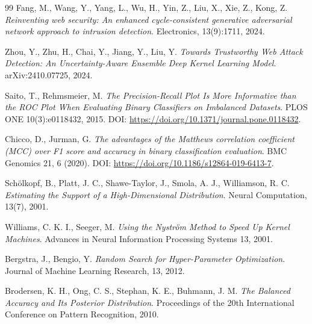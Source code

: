 \documentclass[12pt,oneside]{report}
\begin{document}
\begin{thebibliography}{99}
Fang, M., Wang, Y., Yang, L., Wu, H., Yin, Z., Liu, X., Xie, Z., Kong, Z.
\emph{Reinventing web security: An enhanced cycle-consistent generative adversarial network approach to intrusion detection}.
Electronics, 13(9):1711, 2024.

Zhou, Y., Zhu, H., Chai, Y., Jiang, Y., Liu, Y.
\emph{Towards Trustworthy Web Attack Detection: An Uncertainty-Aware Ensemble Deep Kernel Learning Model}.
arXiv:2410.07725, 2024.

Saito, T., Rehmsmeier, M.
\emph{The Precision-Recall Plot Is More Informative than the ROC Plot When Evaluating Binary Classifiers on Imbalanced Datasets}.
PLOS ONE 10(3):e0118432, 2015. DOI: \url{https://doi.org/10.1371/journal.pone.0118432}.

Chicco, D., Jurman, G.
\emph{The advantages of the Matthews correlation coefficient (MCC) over F1 score and accuracy in binary classification evaluation}.
BMC Genomics 21, 6 (2020). DOI: \url{https://doi.org/10.1186/s12864-019-6413-7}.


Schölkopf, B., Platt, J. C., Shawe-Taylor, J., Smola, A. J., Williamson, R. C.
\emph{Estimating the Support of a High-Dimensional Distribution}.
Neural Computation, 13(7), 2001.

Williams, C. K. I., Seeger, M.
\emph{Using the Nyström Method to Speed Up Kernel Machines}.
Advances in Neural Information Processing Systems 13, 2001.

Bergstra, J., Bengio, Y.
\emph{Random Search for Hyper-Parameter Optimization}.
Journal of Machine Learning Research, 13, 2012.

Brodersen, K. H., Ong, C. S., Stephan, K. E., Buhmann, J. M.
\emph{The Balanced Accuracy and Its Posterior Distribution}.
Proceedings of the 20th International Conference on Pattern Recognition, 2010.

\end{thebibliography}
\end{document}
